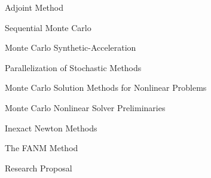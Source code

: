 \documentclass{beamer}
\begin{document}
\begin{frame}{Adjoint Method}

\end{frame}

\begin{frame}{Sequential Monte Carlo}

\end{frame}

\begin{frame}{Monte Carlo Synthetic-Acceleration}

\end{frame}

\begin{frame}{Parallelization of Stochastic Methods}

\end{frame}

\begin{frame}{Monte Carlo Solution Methods for Nonlinear Problems}

\end{frame}

\begin{frame}{Monte Carlo Nonlinear Solver Preliminaries}

\end{frame}

\begin{frame}{Inexact Newton Methods}

\end{frame}

\begin{frame}{The FANM Method}

\end{frame}

\begin{frame}{Research Proposal}

\end{frame}
\end{document}
